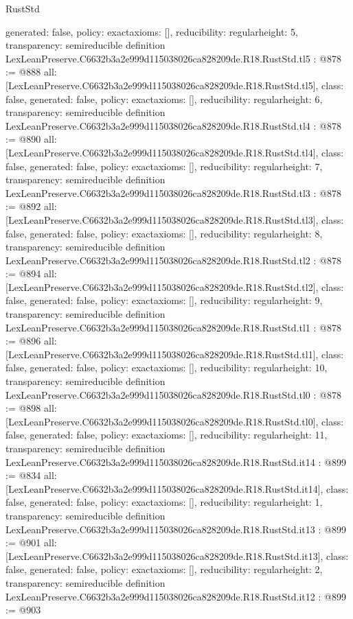 \begin{lexlean}{RustStd}
\begin{coremodule}
{  generated: false,
  policy: exact{axioms: []},
  reducibility: regular{height: 5},
  transparency: semireducible
}
definition LexLeanPreserve.C6632b3a2e999d115038026ca828209de.R18.RustStd.tl5 : @878 := @888 {
  all: [LexLeanPreserve.C6632b3a2e999d115038026ca828209de.R18.RustStd.tl5],
  class: false,
  generated: false,
  policy: exact{axioms: []},
  reducibility: regular{height: 6},
  transparency: semireducible
}
definition LexLeanPreserve.C6632b3a2e999d115038026ca828209de.R18.RustStd.tl4 : @878 := @890 {
  all: [LexLeanPreserve.C6632b3a2e999d115038026ca828209de.R18.RustStd.tl4],
  class: false,
  generated: false,
  policy: exact{axioms: []},
  reducibility: regular{height: 7},
  transparency: semireducible
}
definition LexLeanPreserve.C6632b3a2e999d115038026ca828209de.R18.RustStd.tl3 : @878 := @892 {
  all: [LexLeanPreserve.C6632b3a2e999d115038026ca828209de.R18.RustStd.tl3],
  class: false,
  generated: false,
  policy: exact{axioms: []},
  reducibility: regular{height: 8},
  transparency: semireducible
}
definition LexLeanPreserve.C6632b3a2e999d115038026ca828209de.R18.RustStd.tl2 : @878 := @894 {
  all: [LexLeanPreserve.C6632b3a2e999d115038026ca828209de.R18.RustStd.tl2],
  class: false,
  generated: false,
  policy: exact{axioms: []},
  reducibility: regular{height: 9},
  transparency: semireducible
}
definition LexLeanPreserve.C6632b3a2e999d115038026ca828209de.R18.RustStd.tl1 : @878 := @896 {
  all: [LexLeanPreserve.C6632b3a2e999d115038026ca828209de.R18.RustStd.tl1],
  class: false,
  generated: false,
  policy: exact{axioms: []},
  reducibility: regular{height: 10},
  transparency: semireducible
}
definition LexLeanPreserve.C6632b3a2e999d115038026ca828209de.R18.RustStd.tl0 : @878 := @898 {
  all: [LexLeanPreserve.C6632b3a2e999d115038026ca828209de.R18.RustStd.tl0],
  class: false,
  generated: false,
  policy: exact{axioms: []},
  reducibility: regular{height: 11},
  transparency: semireducible
}
definition LexLeanPreserve.C6632b3a2e999d115038026ca828209de.R18.RustStd.it14 : @899 := @834 {
  all: [LexLeanPreserve.C6632b3a2e999d115038026ca828209de.R18.RustStd.it14],
  class: false,
  generated: false,
  policy: exact{axioms: []},
  reducibility: regular{height: 1},
  transparency: semireducible
}
definition LexLeanPreserve.C6632b3a2e999d115038026ca828209de.R18.RustStd.it13 : @899 := @901 {
  all: [LexLeanPreserve.C6632b3a2e999d115038026ca828209de.R18.RustStd.it13],
  class: false,
  generated: false,
  policy: exact{axioms: []},
  reducibility: regular{height: 2},
  transparency: semireducible
}
definition LexLeanPreserve.C6632b3a2e999d115038026ca828209de.R18.RustStd.it12 : @899 := @903 {
}
\end{coremodule}
\end{lexlean}
